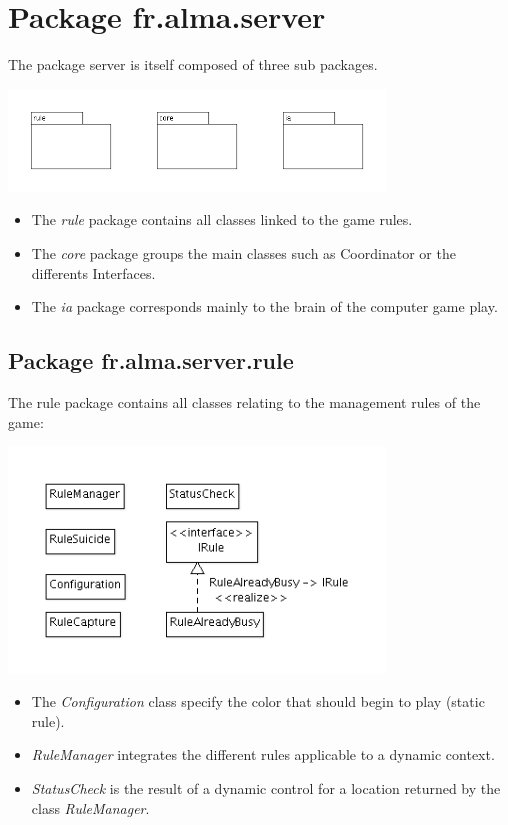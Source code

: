 \documentclass[a4paper,12pt]{report}
\begin{document}
    \section{Package fr.alma.server}
	The package server is itself composed of three sub packages.
	\begin{center}
	    \includegraphics[width=0.75\textwidth]{img_rapport/designing_2.png}
	\end{center}
	\begin{itemize}
	    \item The \textit{rule} package contains all classes linked to the game rules.
	    \item The \textit{core} package groups the main classes such as Coordinator or the differents Interfaces.
	    \item The \textit{ia} package corresponds mainly to the brain of the computer game play.
	\end{itemize}

      \subsection{Package fr.alma.server.rule}
	  The rule package contains all classes relating to the management rules of the game:
	  \begin{center}
	      \includegraphics[width=0.75\textwidth]{img_rapport/designing_3.png}
	  \end{center}

	  \begin{itemize}
	      \item The \textit{Configuration} class specify the color that should begin to play (static rule).
	      \item \textit{RuleManager} integrates the different rules applicable to a dynamic context.
	      \item \textit{StatusCheck} is the result of a dynamic control for a location returned by the class \textit{RuleManager}.
	  \end{itemize}
\end{document}
